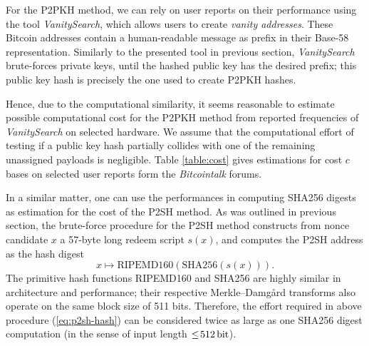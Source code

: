 \documentclass[a4paper,11pt,titlepage]{scrbook}
\begin{document}
For the {P2PKH} method, we can rely on user reports on their performance using the tool \emph{VanitySearch}, which allows users to create \emph{vanity addresses}.
These Bitcoin addresses contain a human-readable message as prefix in their Base-58 representation. \cite[Cf.][82--83]{antonopoulos_mastering_2017}
Similarly to the presented tool in previous section, \emph{VanitySearch} brute-forces private keys, until the hashed public key has the desired prefix;
this public key hash is precisely the one used to create {P2PKH} hashes.

Hence, due to the computational similarity, it seems reasonable to estimate possible computational cost for the {P2PKH} method from reported frequencies of \emph{VanitySearch} on selected hardware.
We assume that the computational effort of testing if a public key hash partially collides with one of the remaining unassigned payloads is negligible.
Table \ref{table:cost} gives estimations for cost $c$ bases on selected user reports form the \emph{Bitcointalk} forums.

In a similar matter, one can use the performances in computing {SHA256} digests as estimation for the cost of the {P2SH} method.
As was outlined in previous section, the brute-force procedure for the {P2SH} method constructs from nonce candidate $x$ a 57-byte long redeem script $s(x)$, and computes the {P2SH} address as the hash digest 
\begin{equation}
    x \mapsto \text{{RIPEMD160}}(\text{{SHA256}}(s(x))).\label{eq:p2sh-hash}
\end{equation}
The primitive hash functions {RIPEMD160} and {SHA256} are highly similar in architecture and performance; their respective Merkle–Damgård transforms also operate on the same block size of 511 bits.
Therefore, the effort required in above procedure (\ref{eq:p2sh-hash}) can be considered twice as large as one {SHA256} digest computation (in the sense of input length $\leq\!\SI{512}{\bit}$). 
\end{document}
